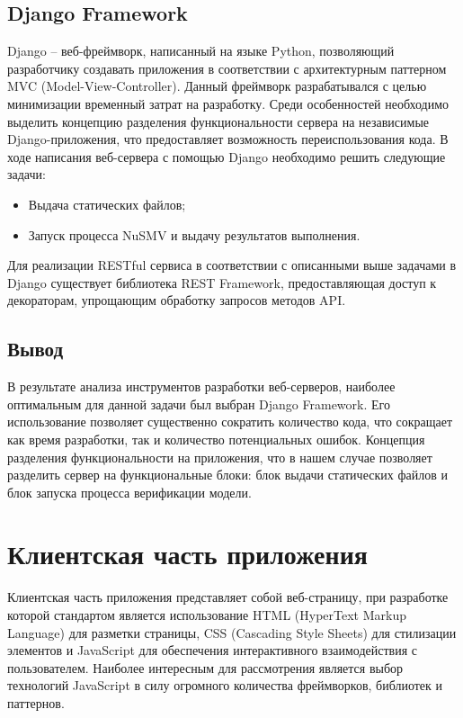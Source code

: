 \subsection{Django Framework}

Django – веб-фреймворк, написанный на языке Python, позволяющий разработчику создавать приложения в соответствии с архитектурным паттерном MVC (Model-View-Controller). Данный фреймворк разрабатывался с целью минимизации временный затрат на разработку. Среди особенностей необходимо выделить концепцию разделения функциональности сервера на независимые Django-приложения, что предоставляет возможность переиспользования кода. В ходе написания веб-сервера с помощью Django необходимо решить следующие задачи:

\begin{itemize}
	\item Выдача статических файлов;
	\item Запуск процесса NuSMV и выдачу результатов выполнения.
\end{itemize}

Для реализации RESTful сервиса в соответствии с описанными выше задачами в Django существует библиотека REST Framework, предоставляющая доступ к декораторам, упрощающим обработку запросов методов API.

\subsection{Вывод} 

В результате анализа инструментов разработки веб-серверов, наиболее оптимальным для данной задачи был выбран Django Framework. Его использование позволяет существенно сократить количество кода, что сокращает как время разработки, так и количество потенциальных ошибок. Концепция разделения функциональности на приложения, что в нашем случае позволяет разделить сервер на функциональные блоки: блок выдачи статических файлов и блок запуска процесса верификации модели. 

\section{Клиентская часть приложения}

Клиентская часть приложения представляет собой веб-страницу, при разработке которой стандартом является использование HTML (HyperText Markup Language) для разметки страницы, CSS (Cascading Style Sheets) для стилизации элементов и JavaScript для обеспечения интерактивного взаимодействия с пользователем. Наиболее интересным для рассмотрения является выбор технологий JavaScript в силу огромного количества фреймворков, библиотек и паттернов.

